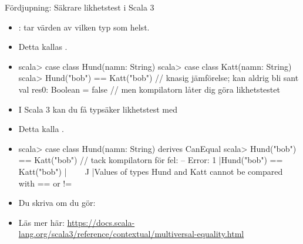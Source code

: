 \begin{Slide}{Fördjupning: Säkrare likhetstest i Scala 3}
\SlideFontSmall
\begin{itemize}
\item {}:  tar värden av vilken typ som helst.
\item Detta kallas .
\item[]
\begin{REPLsmall}
scala> case class Hund(namn: String)
scala> case class Katt(namn: String)
scala> Hund("bob") == Katt("bob") // knasig jämförelse; kan aldrig bli sant
val res0: Boolean = false         // men kompilatorn låter dig göra likhetstestet
\end{REPLsmall}  
\item I Scala 3 kan du få typsäker likhetstest med~~
\item Detta kalla .
\item[]
\begin{REPLsmall}
scala> case class Hund(namn: String) derives CanEqual
scala> Hund("bob") == Katt("bob")   // tack kompilatorn för fel:
-- Error:
1 |Hund("bob") == Katt("bob")
  |^^^^^^^^^^^^^^^^^^^^^^^^^^
  |Values of types Hund and Katt cannot be compared with == or !=
\end{REPLsmall}  
\item Du  skriva  om du gör: \\ 
\item Läs mer här: \url{https://docs.scala-lang.org/scala3/reference/contextual/multiversal-equality.html}

\end{itemize}

\end{Slide}
